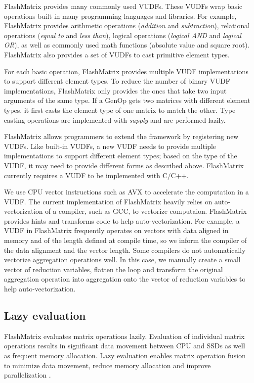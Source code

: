 FlashMatrix provides many commonly used VUDFs. These VUDFs wrap
basic operations built in many programming languages and libraries. For example,
FlashMatrix provides arithmetic operations (\textit{addition} and
\textit{subtraction}), relational operations (\textit{equal to} and
\textit{less than}), logical operations (\textit{logical AND} and
\textit{logical OR}), as well as commonly used math functions (absolute value and square root). 
FlashMatrix also provides a set of VUDFs to
cast primitive element types.

For each basic operation, FlashMatrix provides multiple VUDF
implementations to support different element types. To reduce the number
of binary VUDF implementations, FlashMatrix only provides the ones that take
two input arguments of the same type. If a GenOp gets two matrices with different
element types, it first casts the element type of one matrix to match
the other. %
Type casting operations are
implemented with \textit{sapply} and are performed lazily.

FlashMatrix allows programmers to extend the framework by registering new VUDFs.
Like built-in VUDFs, a new VUDF needs to provide multiple
implementations to support different element types; based on the type of
the VUDF, it may need to provide different forms as described above.
FlashMatrix currently requires a VUDF to be implemented with C/C++.

We use CPU vector instructions such as AVX \cite{avx} to accelerate
the computation in a VUDF. The current implementation of FlashMatrix heavily
relies on auto-vectorization of a compiler, such as GCC, to vectorize
computaion. FlashMatrix provides hints and
transforms code to help auto-vectorization. For example, a VUDF in FlashMatrix
frequently operates on vectors with data aligned in memory and of
the length defined at compile time, so we inform the compiler of the data alignment
and the vector length. Some compilers do not automatically vectorize
aggregation operations well. In this case, we manually create a small vector of reduction
variables, flatten the loop and transform the original aggregation operation
into aggregation onto the vector of reduction variables to help auto-vectorization.

\subsection{Lazy evaluation} \label{sec:lazy_eval}
FlashMatrix evaluates matrix operations lazily. Evaluation of individual
matrix operations results in significant data movement between CPU and SSDs
as well as frequent memory allocation.
Lazy evaluation enables matrix operation fusion to minimize data movement,
reduce memory allocation and improve parallelization \cite{Ching12}.

